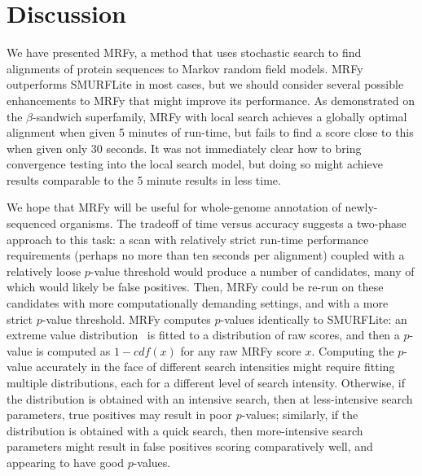 \documentclass{acm_proc_article-sp}
\begin{document}



\section{Discussion}

We have presented MRFy, a method that uses stochastic search to find 
alignments of protein sequences to Markov random field models.
MRFy outperforms SMURFLite in most cases, but we should consider several 
possible enhancements to MRFy that might improve its performance.
As demonstrated on the $\beta$-sandwich superfamily, MRFy with local search 
achieves a globally optimal alignment when given 5 minutes of run-time, but 
fails to find a score close to this when given only 30 seconds.
It was not immediately clear how to bring convergence testing into the local
search model, but doing so might achieve results comparable to the 5 minute
results in less time.

We hope that MRFy will be useful for whole-genome annotation of newly-sequenced
organisms.
The tradeoff of time versus accuracy suggests a two-phase approach to this task:
a scan with relatively strict run-time performance requirements (perhaps no more
than ten seconds per alignment) coupled with a relatively loose $p$-value 
threshold would produce a number of candidates, many of which would likely be
false positives.
Then, MRFy could be re-run on these candidates with more computationally
demanding settings, and with a more strict $p$-value threshold.
MRFy computes $p$-values identically to SMURFLite: an extreme value 
distribution~\cite{Eddy:1998ut} is fitted to a distribution of raw scores,
and then a $p$-value is computed as $1-cdf\left( x \right)$ for any raw MRFy 
score $x$.
Computing the $p$-value accurately in the face of different search intensities
might require fitting multiple distributions, each for a different level of
search intensity.
Otherwise, if the distribution is obtained with an intensive search, then at
less-intensive search parameters, true positives may result in poor $p$-values;
similarly, if the distribution is obtained with a quick search, then 
more-intensive search parameters might result in false positives scoring 
comparatively well, and appearing to have good $p$-values.
\end{document}

